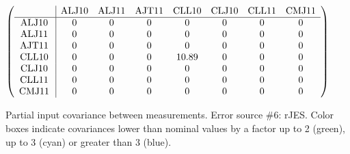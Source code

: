 \begin{table}[H]
\scriptsize
\begin{center}
\renewcommand{\arraystretch}{1.1}
\begin{math}\left(\begin{array}{c|ccccccc}
 & \mathrm{ALJ10} & 
\mathrm{ALJ11} & 
\mathrm{AJT11} & 
\mathrm{CLL10} & 
\mathrm{CLJ10} & 
\mathrm{CLL11} & 
\mathrm{CMJ11} \\
\hline
\mathrm{ALJ10} \hspace*{2pt} &  0 &  0 &  0 &  0 &  0 &  0 &  0 \\
\mathrm{ALJ11} \hspace*{2pt} &  0 &  0 &  0 &  0 &  0 &  0 &  0 \\
\mathrm{AJT11} \hspace*{2pt} &  0 &  0 &  0 &  0 &  0 &  0 &  0 \\
\mathrm{CLL10} \hspace*{2pt} &  0 &  0 &  0 &      10.89 &  0 &  0 &  0 \\
\mathrm{CLJ10} \hspace*{2pt} &  0 &  0 &  0 &  0 &  0 &  0 &  0 \\
\mathrm{CLL11} \hspace*{2pt} &  0 &  0 &  0 &  0 &  0 &  0 &  0 \\
\mathrm{CMJ11} \hspace*{2pt} &  0 &  0 &  0 &  0 &  0 &  0 &  0 \\
\end{array}\right)\end{math}
\caption{Partial input covariance between measurements. Error source \#6: rJES. Color boxes indicate covariances lower than nominal values by a factor up to 2 (green), up to 3 (cyan) or greater than 3 (blue).}
\renewcommand{\arraystretch}{1}
\end{center}
\end{table}
